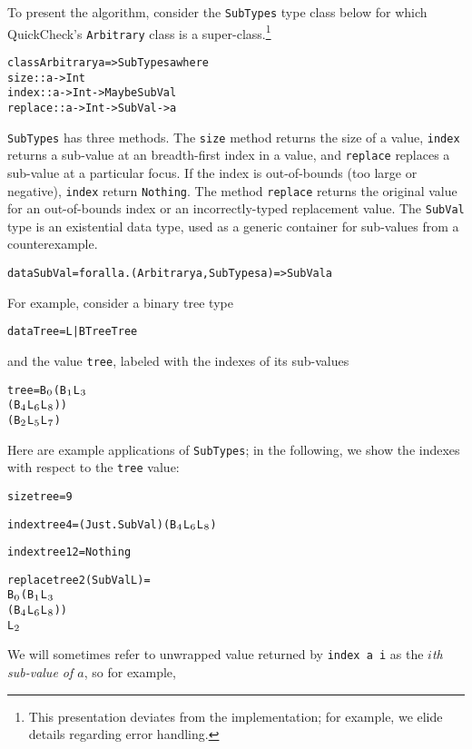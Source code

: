 \documentclass[9pt]{sigplanconf}
\newenvironment{code}{\begin{alltt}\scriptsize}{\end{alltt}}
\newcommand{\ttp}[1]{\texttt{#1}}
\newcommand{\sub}[1]{\(\sb{#1}\)}
\begin{document}
To present the algorithm, consider the \ttp{SubTypes} type class below for which
QuickCheck's \ttp{Arbitrary} class is a super-class.\footnote{This presentation
  deviates from the implementation; for example, we elide details regarding
  error handling.}
%
\begin{code}
class Arbitrary a => SubTypes a where
  size    :: a -> Int
  index   :: a -> Int -> Maybe SubVal
  replace :: a -> Int -> SubVal -> a
\end{code}
%
\noindent
\ttp{SubTypes} has three methods.  The \ttp{size} method returns the size of a
value, \ttp{index} returns a sub-value at an breadth-first index in a value, and
\ttp{replace} replaces a sub-value at a particular focus.  If the index is
out-of-bounds (too large or negative), \ttp{index} return \ttp{Nothing}.  The
method \ttp{replace} returns the original value for an out-of-bounds index or an
incorrectly-typed replacement value.  The \ttp{SubVal} type is an existential
data type, used as a generic container for sub-values from a counterexample.
%
\begin{code}
data SubVal = forall a. (Arbitrary a, SubTypes a) => SubVal a
\end{code}
%
\noindent
For example, consider a binary tree type
%
\begin{code}
data Tree = L | B Tree Tree
\end{code}
% 
\noindent
and the value \ttp{tree}, labeled with the indexes of its sub-values
%
\begin{code}
tree = B\sub{0} (B\sub{1} L\sub{3} 
             (B\sub{4} L\sub{6} L\sub{8}))
          (B\sub{2} L\sub{5} L\sub{7})
\end{code}
%
\noindent
Here are example applications of \ttp{SubTypes}; in the following, we show
the indexes with respect to the \ttp{tree} value:
%
\begin{code}
size tree = 9

index tree 4 = (Just . SubVal) (B\sub{4} L\sub{6} L\sub{8})

index tree 12 = Nothing

replace tree 2 (SubVal L) = 
  B\sub{0} (B\sub{1} L\sub{3} 
        (B\sub{4} L\sub{6} L\sub{8}))
     L\sub{2}
\end{code}
%
\noindent
We will sometimes refer to unwrapped value returned by \ttp{index a i} as the
\emph{$i$th sub-value of $a$}, so for example,
\end{document}
